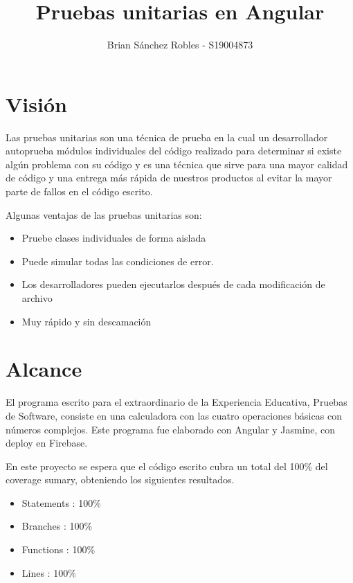 \documentclass{article}
\title{Pruebas unitarias en Angular}
\author{Brian Sánchez Robles - S19004873}
\begin{document}
\date{}

\maketitle


\section{Visión}
Las pruebas unitarias son una técnica de prueba en la cual un desarrollador autoprueba módulos individuales del código realizado para determinar si existe algún problema con su código y es una técnica que sirve para una mayor calidad de código y una entrega más rápida de nuestros productos al evitar la mayor parte de fallos en el código escrito.

Algunas ventajas de las pruebas unitarias son: 
\begin{itemize}

\item Pruebe clases individuales de forma aislada
\item Puede simular todas las condiciones de error.
\item Los desarrolladores pueden ejecutarlos después de cada modificación de archivo
\item Muy rápido y sin descamación
\end{itemize}


\section{Alcance}
El programa escrito para el extraordinario de la Experiencia Educativa, Pruebas de Software, consiste en una calculadora con las cuatro operaciones básicas con números complejos. Este programa fue elaborado con Angular y Jasmine, con deploy en Firebase.

En este proyecto se espera que el código escrito cubra un total del 100\% del coverage sumary, obteniendo los siguientes resultados.

\begin{itemize}

\item Statements : 100\%
\item Branches   : 100\%
\item Functions  : 100\%
\item Lines      : 100\%
\end{itemize}
\end{document}
